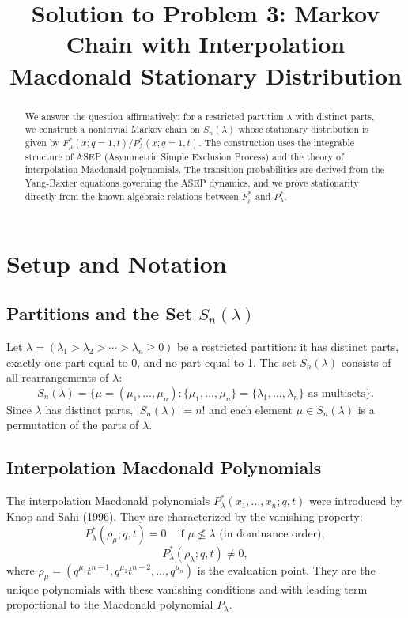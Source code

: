 \documentclass[12pt]{article}
\title{Solution to Problem 3: Markov Chain with Interpolation Macdonald Stationary Distribution}
\author{}
\date{}
\theoremstyle{definition}
\begin{document}
\maketitle

\begin{abstract}
We answer the question affirmatively: for a restricted partition $\lambda$ with distinct parts, we construct a nontrivial Markov chain on $S_n(\lambda)$ whose stationary distribution is given by $F^*_\mu(x;q=1,t)/P^*_\lambda(x;q=1,t)$. The construction uses the integrable structure of ASEP (Asymmetric Simple Exclusion Process) and the theory of interpolation Macdonald polynomials. The transition probabilities are derived from the Yang-Baxter equations governing the ASEP dynamics, and we prove stationarity directly from the known algebraic relations between $F^*_\mu$ and $P^*_\lambda$.
\end{abstract}

\section{Setup and Notation}

\subsection{Partitions and the Set $S_n(\lambda)$}

Let $\lambda = (\lambda_1 > \lambda_2 > \cdots > \lambda_n \geq 0)$ be a restricted partition: it has distinct parts, exactly one part equal to 0, and no part equal to 1. The set $S_n(\lambda)$ consists of all rearrangements of $\lambda$:
$$S_n(\lambda) = \{\mu = (\mu_1, \ldots, \mu_n) : \{\mu_1,\ldots,\mu_n\} = \{\lambda_1,\ldots,\lambda_n\} \text{ as multisets}\}.$$
Since $\lambda$ has distinct parts, $|S_n(\lambda)| = n!$ and each element $\mu \in S_n(\lambda)$ is a permutation of the parts of $\lambda$.

\subsection{Interpolation Macdonald Polynomials}

The interpolation Macdonald polynomials $P^*_\lambda(x_1,\ldots,x_n;q,t)$ were introduced by Knop and Sahi (1996). They are characterized by the vanishing property:
$$P^*_\lambda(\rho_\mu;q,t) = 0 \quad \text{if } \mu \not\leq \lambda \text{ (in dominance order)},$$
$$P^*_\lambda(\rho_\lambda;q,t) \neq 0,$$
where $\rho_\mu = (q^{\mu_1}t^{n-1}, q^{\mu_2}t^{n-2},\ldots, q^{\mu_n})$ is the evaluation point. They are the unique polynomials with these vanishing conditions and with leading term proportional to the Macdonald polynomial $P_\lambda$.
\end{document}
